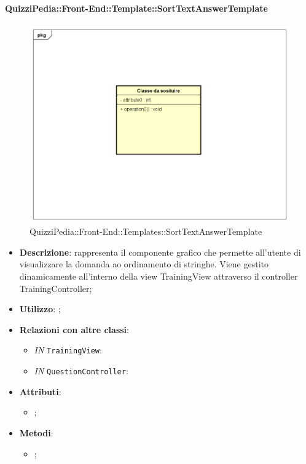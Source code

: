 		\paragraph{QuizziPedia::Front-End::Template::SortTextAnswerTemplate}
		
				\label{QuizziPedia::Front-End::Templates::SortTextAnswerTemplate}

				\begin{figure}[h]
					\centering
					\includegraphics[scale=0.5,keepaspectratio]{UML/Classi/Front-End/Temporanea.png}
					\caption{QuizziPedia::Front-End::Templates::SortTextAnswerTemplate}
				\end{figure}
		
			\begin{itemize}
				\item \textbf{Descrizione}: rappresenta il componente grafico che permette all'utente di visualizzare la domanda ao ordinamento di stringhe. Viene gestito dinamicamente all'interno della view TrainingView attraverso il controller TrainingController;
				\item \textbf{Utilizzo}: ;
				\item \textbf{Relazioni con altre classi}: 
				\begin{itemize}
						\item \textit{IN} \texttt{TrainingView}: 
						\item \textit{IN} \texttt{QuestionController}:
				\end{itemize}
				\item \textbf{Attributi}: 
				\begin{itemize}
					\item ;
				\end{itemize}
				\item \textbf{Metodi}: 
				\begin{itemize}
					\item ;
				\end{itemize}
			\end{itemize}
		
